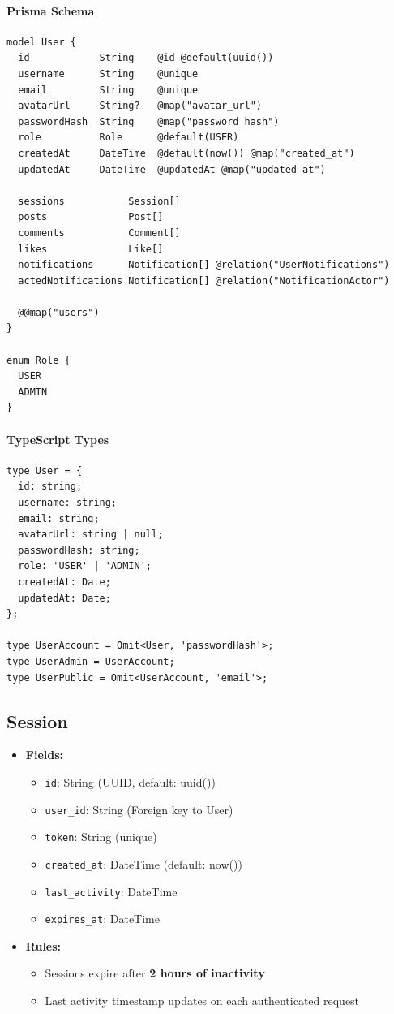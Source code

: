 \documentclass[11pt,a4paper]{article}
\begin{document}
\paragraph{Prisma Schema}
\begin{lstlisting}
model User {
  id            String    @id @default(uuid())
  username      String    @unique
  email         String    @unique
  avatarUrl     String?   @map("avatar_url")
  passwordHash  String    @map("password_hash")
  role          Role      @default(USER)
  createdAt     DateTime  @default(now()) @map("created_at")
  updatedAt     DateTime  @updatedAt @map("updated_at")
  
  sessions           Session[]
  posts              Post[]
  comments           Comment[]
  likes              Like[]
  notifications      Notification[] @relation("UserNotifications")
  actedNotifications Notification[] @relation("NotificationActor")
  
  @@map("users")
}

enum Role {
  USER
  ADMIN
}
\end{lstlisting}

\paragraph{TypeScript Types}
\begin{lstlisting}
type User = {
  id: string;
  username: string;
  email: string;
  avatarUrl: string | null;
  passwordHash: string;
  role: 'USER' | 'ADMIN';
  createdAt: Date;
  updatedAt: Date;
};

type UserAccount = Omit<User, 'passwordHash'>;
type UserAdmin = UserAccount;
type UserPublic = Omit<UserAccount, 'email'>;
\end{lstlisting}

\subsection{Session}
\begin{itemize}
    \item \textbf{Fields:}
    \begin{itemize}
        \item \texttt{id}: String (UUID, default: uuid())
        \item \texttt{user\_id}: String (Foreign key to User)
        \item \texttt{token}: String (unique)
        \item \texttt{created\_at}: DateTime (default: now())
        \item \texttt{last\_activity}: DateTime
        \item \texttt{expires\_at}: DateTime
    \end{itemize}
    \item \textbf{Rules:}
    \begin{itemize}
        \item Sessions expire after \textbf{2 hours of inactivity}
        \item Last activity timestamp updates on each authenticated request
    \end{itemize}
\end{itemize}
\end{document}
